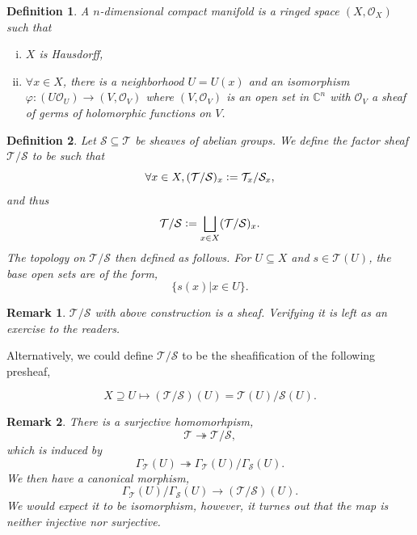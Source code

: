 \documentclass{article}
\newtheorem{definition}{Definition}[section]
\newtheorem{remark}{Remark}[section]
\newcommand{\defeq}{\vcentcolon=}
\newcommand{\cS}[0]{\mathcal{S}}
\newcommand{\cT}[0]{\mathcal{T}}
\newcommand{\C}[0]{\mathbb{C}}
\newcommand{\Ouv}[0]{\mathcal{O}}
\begin{document}
\begin{definition}
  A $n$-dimensional compact manifold is a ringed space $(X,\Ouv_X)$ such that 
  \begin{enumerate}[i).]
    \item $X$ is Hausdorff,
    \item $\forall x\in X$, there is a neighborhood $U=U(x)$ and an isomorphism $\varphi:(U\Ouv_U)\to (V,\Ouv_V)$ where $(V,\Ouv_V)$ is an open set in $\C^n$ with $\Ouv_V$ a sheaf of germs of holomorphic functions on $V$.
  \end{enumerate}
\end{definition}

\begin{definition}
  Let $\mathcal{S}\subseteq\mathcal{T}$ be sheaves of abelian groups. We define the factor sheaf $\mathcal{T}/\mathcal{S}$ to be such that 
  \begin{equation*}
    \forall x\in X, (\mathcal{T}/\mathcal{S})_x \defeq \mathcal{T}_x/\mathcal{S}_x,
  \end{equation*}
  and thus 
  \begin{equation*}
    \mathcal{T}/\mathcal{S} \defeq \bigsqcup_{x\in X}(\mathcal{T}/\mathcal{S})_x.
  \end{equation*}
  The topology on $\mathcal{T}/\mathcal{S}$ then defined as follows. For $U\subseteq X$ and $s\in\mathcal{T}(U)$, the base open sets are of the form,
  \begin{equation*}
    \{s(x)|x\in U\}.
  \end{equation*}
\end{definition}

\begin{remark}
  $\mathcal{T}/\mathcal{S}$ with above construction is a sheaf. Verifying it is left as an exercise to the readers.
\end{remark}

Alternatively, we could define $\mathcal{T}/\mathcal{S}$ to be the sheafification of the following presheaf,

\begin{equation*}
  X\supseteq U\mapsto (\mathcal{T}/\mathcal{S})(U) = \mathcal{T}(U)/\mathcal{S}(U).
\end{equation*}

\begin{remark}
  There is a surjective homomorhpism,
  \begin{equation*}
    \cT\twoheadrightarrow \cT/\cS,
  \end{equation*}
  which is induced by 
  \begin{equation*}
    \Gamma_{\cT}(U)\twoheadrightarrow\Gamma_{\cT}(U)/\Gamma_{\cS}(U).
  \end{equation*}
  We then have a canonical morphism,
  \begin{equation*}
    \Gamma_{\cT}(U)/\Gamma_{\cS}(U)\to (\cT/\cS)(U).
  \end{equation*}
  We would expect it to be isomorphism, however, it turnes out that the map is neither injective nor surjective.
\end{remark}
\end{document}
